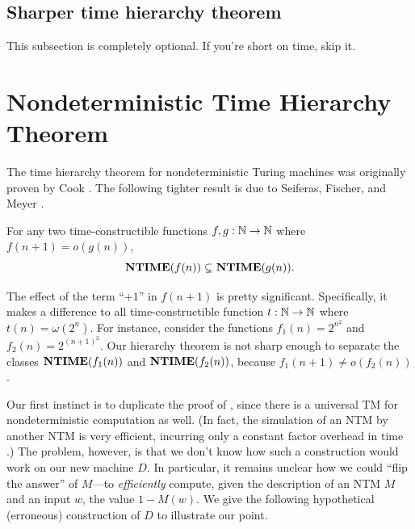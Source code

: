 \documentclass[11pt,twoside=off,numbers=noenddot]{scrbook}
\begin{document}
\subsection{Sharper time hierarchy theorem}

This subsection is completely optional. If you're short on time, skip it.

\section{Nondeterministic Time Hierarchy Theorem}
The time hierarchy theorem for nondeterministic Turing machines was originally proven by Cook \cite{cook1972hierarchy}. The following tighter result is due to Seiferas, Fischer, and Meyer \cite{seiferas1978separating}.

\begin{theorem}
  For any two time-constructible functions $f, g : \mathbb N \to \mathbb N$ where $f(n + 1) = o(g(n))$,
  \[ \textbf{NTIME}(f(n)) \subsetneq \textbf{NTIME}(g(n)). \]
\end{theorem}

\begin{remark}
  The effect of the term ``$+ 1$'' in $f(n + 1)$ is pretty significant. Specifically, it makes a difference to all time-constructible function $t : \mathbb N \to \mathbb N$ where $t(n) = \omega(2^n)$. For instance, consider the functions $f_1(n) = 2^{n^2}$ and $f_2(n) = 2^{(n + 1)^2}$. Our hierarchy theorem is not sharp enough to separate the classes $\textbf{NTIME}(f_1(n))$ and $\textbf{NTIME}(f_2(n))$, because $f_1(n + 1) \neq o(f_2(n))$.
\end{remark}

Our first instinct is to duplicate the proof of , since there is a universal TM for nondeterministic computation as well. (In fact, the simulation of an NTM by another NTM is very efficient, incurring only a constant factor overhead in time \cite{arora2009computational}.) The problem, however, is that we don't know how such a construction would work on our new machine $D$. In particular, it remains unclear how we could ``flip the answer'' of $M$—to \emph{efficiently} compute, given the description of an NTM $M$ and an input $w$, the value $1 - M(w)$. We give the following hypothetical (erroneous) construction of $D$ to illustrate our point.
\end{document}
